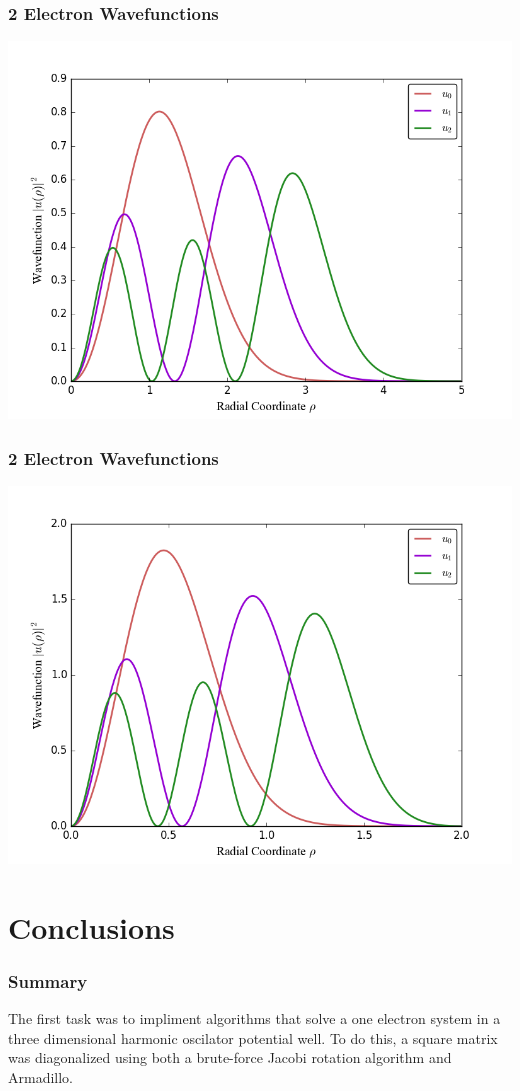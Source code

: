 \documentclass[10pt,xcolor={x11names}]{beamer}
\begin{document}
		\begin{frame} \frametitle{2 Electron Wavefunctions}
			\begin{center}
    		\includegraphics[width=.85\textwidth]{Code/WavefunctionOmega1.png}
    		\end{center}
		\end{frame}

		\begin{frame} \frametitle{2 Electron Wavefunctions}
			\begin{center}
    		\includegraphics[width=.85\textwidth]{Code/WavefunctionOmega5.png}
    		\end{center}
		\end{frame}

	\section{Conclusions}
		\begin{frame} \frametitle{Summary}
			The first task was to impliment algorithms that solve a one electron system in a three dimensional harmonic oscilator potential well. To do this, a square matrix was diagonalized using both a brute-force Jacobi rotation algorithm and Armadillo. 
    		
		\end{frame}
\end{document}
